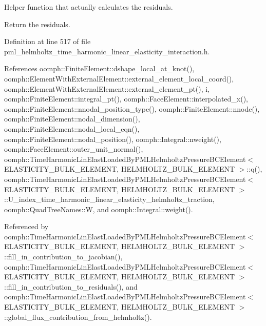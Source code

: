 Helper function that actually calculates the residuals. 

Return the residuals. 

Definition at line 517 of file pml\+\_\+helmholtz\+\_\+time\+\_\+harmonic\+\_\+linear\+\_\+elasticity\+\_\+interaction.\+h.



References oomph\+::\+Finite\+Element\+::dshape\+\_\+local\+\_\+at\+\_\+knot(), oomph\+::\+Element\+With\+External\+Element\+::external\+\_\+element\+\_\+local\+\_\+coord(), oomph\+::\+Element\+With\+External\+Element\+::external\+\_\+element\+\_\+pt(), i, oomph\+::\+Finite\+Element\+::integral\+\_\+pt(), oomph\+::\+Face\+Element\+::interpolated\+\_\+x(), oomph\+::\+Finite\+Element\+::nnodal\+\_\+position\+\_\+type(), oomph\+::\+Finite\+Element\+::nnode(), oomph\+::\+Finite\+Element\+::nodal\+\_\+dimension(), oomph\+::\+Finite\+Element\+::nodal\+\_\+local\+\_\+eqn(), oomph\+::\+Finite\+Element\+::nodal\+\_\+position(), oomph\+::\+Integral\+::nweight(), oomph\+::\+Face\+Element\+::outer\+\_\+unit\+\_\+normal(), oomph\+::\+Time\+Harmonic\+Lin\+Elast\+Loaded\+By\+P\+M\+L\+Helmholtz\+Pressure\+B\+C\+Element$<$ E\+L\+A\+S\+T\+I\+C\+I\+T\+Y\+\_\+\+B\+U\+L\+K\+\_\+\+E\+L\+E\+M\+E\+N\+T, H\+E\+L\+M\+H\+O\+L\+T\+Z\+\_\+\+B\+U\+L\+K\+\_\+\+E\+L\+E\+M\+E\+N\+T $>$\+::q(), oomph\+::\+Time\+Harmonic\+Lin\+Elast\+Loaded\+By\+P\+M\+L\+Helmholtz\+Pressure\+B\+C\+Element$<$ E\+L\+A\+S\+T\+I\+C\+I\+T\+Y\+\_\+\+B\+U\+L\+K\+\_\+\+E\+L\+E\+M\+E\+N\+T, H\+E\+L\+M\+H\+O\+L\+T\+Z\+\_\+\+B\+U\+L\+K\+\_\+\+E\+L\+E\+M\+E\+N\+T $>$\+::\+U\+\_\+index\+\_\+time\+\_\+harmonic\+\_\+linear\+\_\+elasticity\+\_\+helmholtz\+\_\+traction, oomph\+::\+Quad\+Tree\+Names\+::W, and oomph\+::\+Integral\+::weight().



Referenced by oomph\+::\+Time\+Harmonic\+Lin\+Elast\+Loaded\+By\+P\+M\+L\+Helmholtz\+Pressure\+B\+C\+Element$<$ E\+L\+A\+S\+T\+I\+C\+I\+T\+Y\+\_\+\+B\+U\+L\+K\+\_\+\+E\+L\+E\+M\+E\+N\+T, H\+E\+L\+M\+H\+O\+L\+T\+Z\+\_\+\+B\+U\+L\+K\+\_\+\+E\+L\+E\+M\+E\+N\+T $>$\+::fill\+\_\+in\+\_\+contribution\+\_\+to\+\_\+jacobian(), oomph\+::\+Time\+Harmonic\+Lin\+Elast\+Loaded\+By\+P\+M\+L\+Helmholtz\+Pressure\+B\+C\+Element$<$ E\+L\+A\+S\+T\+I\+C\+I\+T\+Y\+\_\+\+B\+U\+L\+K\+\_\+\+E\+L\+E\+M\+E\+N\+T, H\+E\+L\+M\+H\+O\+L\+T\+Z\+\_\+\+B\+U\+L\+K\+\_\+\+E\+L\+E\+M\+E\+N\+T $>$\+::fill\+\_\+in\+\_\+contribution\+\_\+to\+\_\+residuals(), and oomph\+::\+Time\+Harmonic\+Lin\+Elast\+Loaded\+By\+P\+M\+L\+Helmholtz\+Pressure\+B\+C\+Element$<$ E\+L\+A\+S\+T\+I\+C\+I\+T\+Y\+\_\+\+B\+U\+L\+K\+\_\+\+E\+L\+E\+M\+E\+N\+T, H\+E\+L\+M\+H\+O\+L\+T\+Z\+\_\+\+B\+U\+L\+K\+\_\+\+E\+L\+E\+M\+E\+N\+T $>$\+::global\+\_\+flux\+\_\+contribution\+\_\+from\+\_\+helmholtz().

